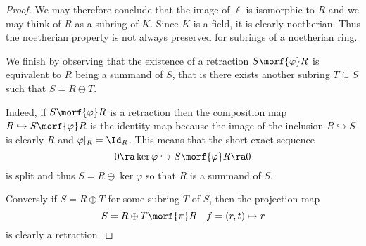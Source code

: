 \begin{proof}
We may therefore conclude that the image of $\ell$ is isomorphic to $R$ and we may think of $R$ as a subring of $K$.
Since $K$ is a field, it is clearly noetherian. Thus the noetherian property is not always preserved for subrings of a
noetherian ring.

We finish by observing that the existence of a retraction $S\morf{\varphi}R$ is equivalent to $R$ being a summand of $S$,
that is there exists another subring $T\subseteq S$ such that $S=R\oplus T$.

Indeed, if $S \morf{\varphi} R$ is a retraction
then the composition map $R\hookrightarrow S \morf{\varphi} R$ is the identity map because the image of the inclusion
$R\hookrightarrow S$ is clearly $R$ and $\varphi|_R=\Id_R$. This means that the short exact sequence
\[
	0 \ra \ker\varphi \hookrightarrow S \morf{\varphi} R \ra 0
\]
is split and thus $S=R\oplus \ker\varphi$ so that $R$ is a summand of $S$.

Conversly if $S=R\oplus T$ for some subring $T$ of $S$, then the projection map
\[
	S=R\oplus T \morf{\pi} R \quad f=(r,t)\mapsto r
\]
is clearly a retraction.


%
\end{proof}%

